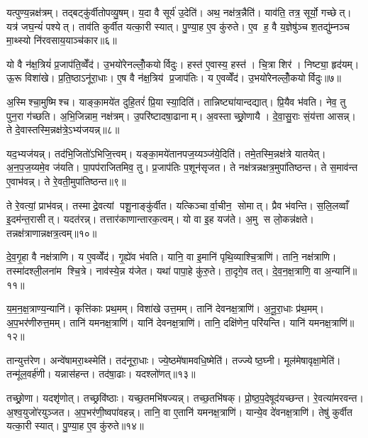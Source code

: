 यत्पुण्य॒न्नक्ष॑त्रम्। तद्बट्कु॑र्वीतोपव्यु॒षम्। य॒दा वै सूर्य॑ उ॒देति॑। अथ॒ नक्ष॑त्र॒न्नैति॑। याव॑ति॒ तत्र॒ सूर्यो॒ गच्छेत्। यत्र॑ जघ॒न्यं॑ पश्येत्। ताव॑ति कुर्वीत यत्का॒री स्यात्। पु॒ण्या॒ह ए॒व कु॑रुते। ए॒व ह॒ वै य॒ज्ञेषु॑ञ्च श॒तद्यु॑म्नञ्च मा॒थ्स्यो नि॑रवसाय॒याञ्च॑कार॥६॥

यो वै न॑क्ष॒त्रियं॑ प्र॒जाप॑ति॒व्वेँद॑। उ॒भयो॑रेनल्लोँ॒कयोर्विदुः। हस्त॑ ए॒वास्य॒ हस्त॑। चि॒त्रा शिर॑। निष्ट्या॒ हृद॑यम्। ऊ॒रू विशा॑खे। प्र॒ति॒ष्ठाऽनू॑रा॒धाः। ए॒ष वै न॑क्ष॒त्रिय॑ प्र॒जाप॑तिः। य ए॒वव्वेँद॑। उ॒भयो॑रेनल्लोँ॒कयोर्विदुः॥७॥

अ॒स्मिश्चा॒मुष्मिश्च। याङ्का॒मये॑त दुहि॒तरं॑ प्रि॒या स्या॒दिति॑। तान्निष्ट्या॑यान्दद्यात्। प्रि॒यैव भ॑वति। नेव॒ तु पुन॒रा ग॑च्छति। अ॒भि॒जिन्नाम॒ नक्ष॑त्रम्। उ॒परि॑ष्टादषा॒ढानाम्। अ॒वस्ताच्छ्रो॒णायै। दे॒वा॒सु॒राः सं॒य॑त्ता आसन्न्। ते दे॒वास्तस्मि॒न्नक्ष॑त्रे॒ऽभ्य॑जयन्न्॥८॥

यद॒भ्यज॑यन्न्। तद॑भि॒जितो॑ऽभिजि॒त्त्वम्। यङ्का॒मये॑तानपज॒य्यञ्ज॑ये॒दिति॑। तमे॒तस्मि॒न्नक्ष॑त्रे यातयेत्। अ॒न॒प॒ज॒य्यमे॒व ज॑यति। पा॒पप॑राजितमिव॒ तु। प्र॒जाप॑तिः प॒शून॑सृजत। ते नक्ष॑त्रन्नक्षत्र॒मुपा॑तिष्ठन्त। ते स॒माव॑न्त ए॒वाभ॑वन्न्। ते रे॒वती॒मुपा॑तिष्ठन्त॥९॥

ते रे॒वत्यां॒ प्राभ॑वन्न्। तस्माद्रे॒वत्यां पशू॒नाङ्कु॑र्वीत। यत्किञ्चार्वा॒चीन॒ सोमात्। प्रैव भ॑वन्ति। स॒लि॒लव्वाँ इ॒दम॑न्त॒रासीत्। यदत॑रन्न्। तत्तार॑काणान्तारक॒त्वम्। यो वा इ॒ह यज॑ते। अ॒मु स लो॒कन्न॑क्षते। तन्नक्ष॑त्राणान्नक्षत्र॒त्वम्॥१०॥

दे॒व॒गृ॒हा वै नक्ष॑त्राणि। य ए॒वव्वेँद॑। गृ॒ह्ये॑व भ॑वति। यानि॒ वा इ॒मानि॑ पृथि॒व्याश्चि॒त्राणि॑। तानि॒ नक्ष॑त्राणि। तस्मा॑दश्ली॒लना॑म श्चि॒त्रे। नाव॑स्ये॒न्न य॑जेत। यथा॑ पापा॒हे कु॑रु॒ते। ता॒दृगे॒व तत्। दे॒व॒न॒क्ष॒त्राणि॒ वा अ॒न्यानि॑॥११॥

य॒म॒न॒क्ष॒त्राण्य॒न्यानि॑। कृत्ति॑काः प्रथ॒मम्। विशा॑खे उत्त॒मम्। तानि॑ देवनक्ष॒त्राणि॑। अ॒नू॒रा॒धाः प्र॑थ॒मम्। अ॒प॒भर॑णीरुत्त॒मम्। तानि॑ यमनक्ष॒त्राणि॑। यानि॑ देवनक्ष॒त्राणि॑। तानि॒ दक्षि॑णेन॒ परि॑यन्ति। यानि॑ यमनक्ष॒त्राणि॑॥१२॥

तान्युत्त॑रेण। अन्वे॑षामरा॒थ्स्मेति॑। तद॑नूरा॒धाः। ज्ये॒ष्ठमे॑षामवधि॒ष्मेति॑। तज्ज्येष्ठ॒घ्नी। मूल॑मेषावृक्षा॒मेति॑। तन्मू॑ल॒वर्\mbox{}ह॑णी। यन्नास॑हन्त। तद॑षा॒ढाः। यदश्लो॑णत्॥१३॥

तच्छ्रो॒णा। यदशृ॑णोत्। तच्छ्रवि॑ष्ठाः। यच्छ॒तमभि॑षज्यन्न्। तच्छ॒तभि॑षक्। प्रो॒ष्ठ॒प॒देषूद॑यच्छन्त। रे॒वत्या॑मरवन्त। अ॒श्व॒युजो॑रयुञ्जत। अ॒प॒भर॑णी॒ष्वपा॑वहन्न्। तानि॒ वा ए॒तानि॑ यमनक्ष॒त्राणि॑। यान्ये॒व दे॑वनक्ष॒त्राणि॑। तेषु॑ कुर्वीत यत्का॒री स्यात्। पु॒ण्या॒ह ए॒व कु॑रुते॥१४॥

